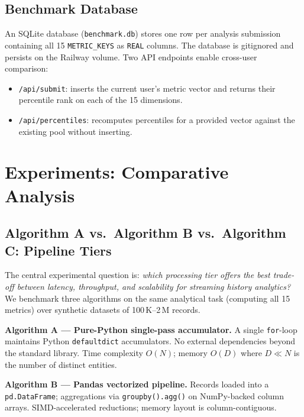 \documentclass[conference]{IEEEtran}
\begin{document}
\subsection{Benchmark Database}

An SQLite database (\texttt{benchmark.db}) stores one row per analysis
submission containing all 15 \texttt{METRIC\_KEYS} as \texttt{REAL} columns.
The database is gitignored and persists on the Railway volume. Two API
endpoints enable cross-user comparison:
\begin{itemize}
  \item \texttt{/api/submit}: inserts the current user's metric vector and
        returns their percentile rank on each of the 15 dimensions.
  \item \texttt{/api/percentiles}: recomputes percentiles for a provided
        vector against the existing pool without inserting.
\end{itemize}

\section{Experiments: Comparative Analysis}

\subsection{Algorithm A vs.\ Algorithm B vs.\ Algorithm C: Pipeline Tiers}

The central experimental question is: \emph{which processing tier offers
the best trade-off between latency, throughput, and scalability for
streaming history analytics?} We benchmark three algorithms on the same
analytical task (computing all 15 metrics) over synthetic datasets of
100\,K–2\,M records.

\textbf{Algorithm A — Pure-Python single-pass accumulator.}
A single \texttt{for}-loop maintains Python \texttt{defaultdict}
accumulators. No external dependencies beyond the standard library.
Time complexity $O(N)$; memory $O(D)$ where $D \ll N$ is the number of
distinct entities.

\textbf{Algorithm B — Pandas vectorized pipeline.}
Records loaded into a \texttt{pd.DataFrame}; aggregations via
\texttt{groupby().agg()} on NumPy-backed column arrays. SIMD-accelerated
reductions; memory layout is column-contiguous.
\end{document}
